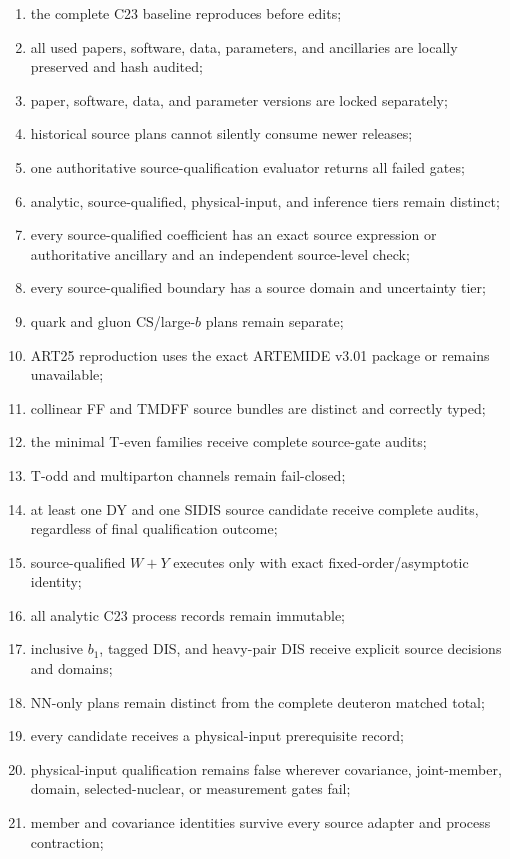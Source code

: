 \documentclass[11pt]{article}
\newcommand{\CS}{\ensuremath{\mathrm{CS}}}
\begin{document}
\begin{enumerate}
\item the complete C23 baseline reproduces before edits;
\item all used papers, software, data, parameters, and ancillaries are locally preserved and hash audited;
\item paper, software, data, and parameter versions are locked separately;
\item historical source plans cannot silently consume newer releases;
\item one authoritative source-qualification evaluator returns all failed gates;
\item analytic, source-qualified, physical-input, and inference tiers remain distinct;
\item every source-qualified coefficient has an exact source expression or authoritative ancillary and an independent source-level check;
\item every source-qualified boundary has a source domain and uncertainty tier;
\item quark and gluon \CS/large-\(b\) plans remain separate;
\item ART25 reproduction uses the exact ARTEMIDE v3.01 package or remains unavailable;
\item collinear FF and TMDFF source bundles are distinct and correctly typed;
\item the minimal T-even families receive complete source-gate audits;
\item T-odd and multiparton channels remain fail-closed;
\item at least one DY and one SIDIS source candidate receive complete audits, regardless of final qualification outcome;
\item source-qualified \(W+Y\) executes only with exact fixed-order/asymptotic identity;
\item all analytic C23 process records remain immutable;
\item inclusive \(b_1\), tagged DIS, and heavy-pair DIS receive explicit source decisions and domains;
\item NN-only plans remain distinct from the complete deuteron matched total;
\item every candidate receives a physical-input prerequisite record;
\item physical-input qualification remains false wherever covariance, joint-member, domain, selected-nuclear, or measurement gates fail;
\item member and covariance identities survive every source adapter and process contraction;

\end{enumerate}
\end{document}
